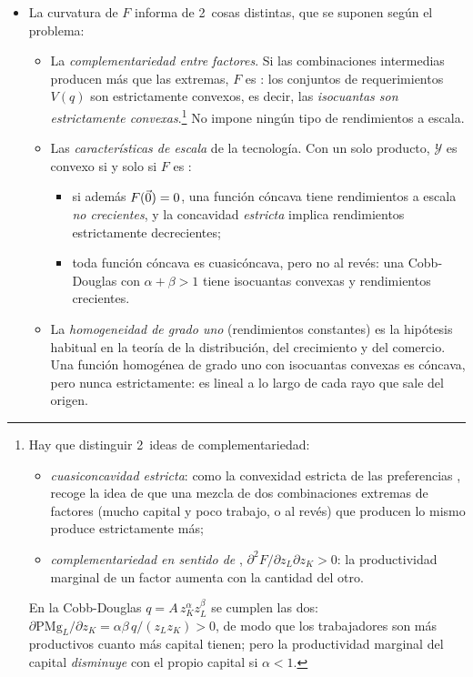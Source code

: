 \documentclass[11pt]{article}
\begin{document}
\begin{itemize}
\item La curvatura de $F$ informa de 2~cosas distintas, que se suponen según el problema:
  \begin{itemize}
  \item La \emph{complementariedad entre factores}. Si las combinaciones intermedias producen más que las extremas, $F$ es : los conjuntos de requerimientos $V(q)$ son estrictamente convexos, es decir, las \emph{isocuantas son estrictamente convexas}\nocite{JehleReny2011Advanced}.\footnote{Hay que distinguir 2~ideas de complementariedad:
\begin{itemize}
\item \emph{cuasiconcavidad estricta}: como la convexidad estricta de las preferencias , recoge la idea de que una mezcla de dos combinaciones extremas de factores (mucho capital y poco trabajo, o al revés) que producen lo mismo produce estrictamente más;
\item \emph{complementariedad en sentido de }, $\partial^2F/\partial z_L\partial z_K>0$: la productividad marginal de un factor aumenta con la cantidad del otro.
\end{itemize}
En la Cobb-Douglas $q=A\,z_K^{\alpha}z_L^{\beta}$ se cumplen las dos: $\partial \mathrm{PMg}_L/\partial z_K=\alpha\beta\,q/(z_Lz_K)>0$, de modo que los trabajadores son más productivos cuanto más capital tienen; pero la productividad marginal del capital \emph{disminuye} con el propio capital si $\alpha<1$.} No impone ningún tipo de rendimientos a escala.
  \item Las \emph{características de escala} de la tecnología. Con un solo producto, $\mathcal{Y}$ es convexo si y solo si $F$ es :
    \begin{itemize}
    \item si además $F(\vec{0})=0$, una función cóncava tiene rendimientos a escala \emph{no crecientes}, y la concavidad \emph{estricta} implica rendimientos estrictamente decrecientes;
    \item toda función cóncava es cuasicóncava, pero no al revés: una Cobb-Douglas con $\alpha+\beta>1$ tiene isocuantas convexas y rendimientos crecientes.
    \end{itemize}
  \item La \emph{homogeneidad de grado uno} (rendimientos constantes) es la hipótesis habitual en la teoría de la distribución, del crecimiento y del comercio. Una función homogénea de grado uno con isocuantas convexas es cóncava, pero nunca estrictamente: es lineal a lo largo de cada rayo que sale del origen.

\end{itemize}
\end{itemize}
\end{document}
